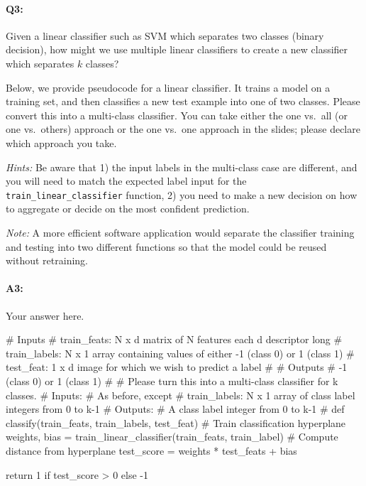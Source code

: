 \pagebreak
\paragraph{Q3:} Given a linear classifier such as SVM which separates two classes (binary decision), how might we use multiple linear classifiers to create a new classifier which separates $k$ classes?

Below, we provide pseudocode for a linear classifier. It trains a model on a training set, and then classifies a new test example into one of two classes. Please convert this into a multi-class classifier. You can take either the one vs.~all (or one vs.~others) approach or the one vs.~one approach in the slides; please declare which approach you take.

\emph{Hints:} Be aware that 1) the input labels in the multi-class case are different, and you will need to match the expected label input for the \texttt{train\_linear\_classifier} function, 2) you need to make a new decision on how to aggregate or decide on the most confident prediction.

\emph{Note:} A more efficient software application would separate the classifier training and testing into two different functions so that the model could be reused without retraining.

\paragraph{A3:} Your answer here.

\begin{python}
# Inputs
#   train_feats: N x d matrix of N features each d descriptor long
#   train_labels: N x 1 array containing values of either -1 (class 0) or 1 (class 1)
#   test_feat: 1 x d image for which we wish to predict a label
#
# Outputs
#   -1 (class 0) or 1 (class 1)
#
# Please turn this into a multi-class classifier for k classes.
# Inputs:
#    As before, except
#    train_labels: N x 1 array of class label integers from 0 to k-1
# Outputs:
#    A class label integer from 0 to k-1
#
def classify(train_feats, train_labels, test_feat)
    # Train classification hyperplane
    weights, bias = train_linear_classifier(train_feats, train_label)
    # Compute distance from hyperplane
    test_score = weights * test_feats + bias

    return 1 if test_score > 0 else -1
\end{python}


